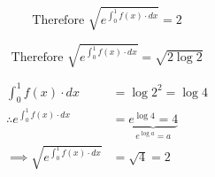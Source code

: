 \documentclass[14pt,fleqn]{extarticle}
\newcommand\intg{\int_0^1 f(x)\cdot dx}
\begin{document}
\begin{problem}
\begin{step}
\end{step}

\begin{step}
  \begin{options} 
     \correct 
       
     \[ \text{Therefore } \sqrt{e^{\int_0^1 f(x)\cdot dx}} = 2 \]  
     \incorrect
     
     \[ \text{Therefore } \sqrt{e^{\int_0^1 f(x)\cdot dx}} = \sqrt{2\log 2} \]
       
        
    \end{options} 
     \reason 
     
     \begin{align}
     \intg &= \log 2^2 = \log 4 \\
	 \therefore e^{\intg} &= \underbrace{e^{\log 4} = 4}_{e^{\log a} = a}\\
	 \implies \sqrt{e^{\intg}} &= \sqrt{4} = 2 
\end{align}
       
\end{step}
      
\end{problem} 
\end{document}
